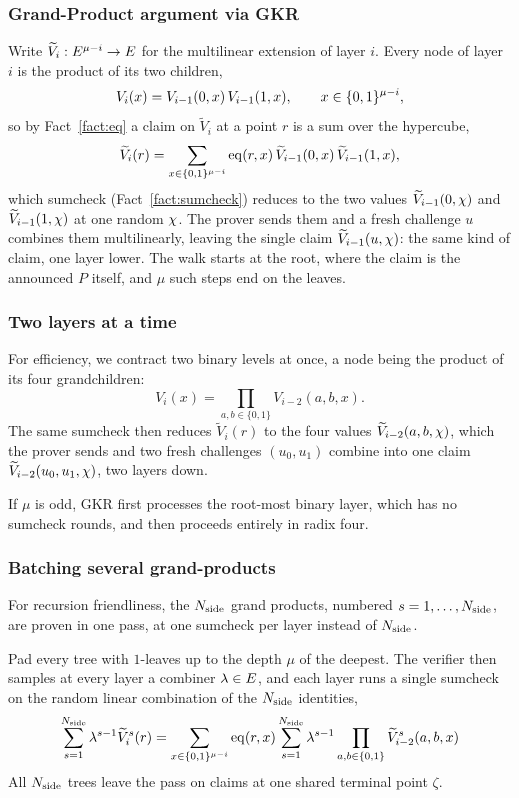 \subsubsection{Grand-Product argument via GKR}

Write $\widetilde V_i:E^{\mu-i}\to E$ for the multilinear extension of layer $i$. Every node of layer $i$ is the product of its two children,
\[
V_i(x)=V_{i-1}(0,x)\,V_{i-1}(1,x),\qquad x\in\{0,1\}^{\mu-i},
\]
so by Fact~\ref{fact:eq} a claim on $\widetilde V_i$ at a point $r$ is a sum over the hypercube,
\[
\widetilde V_i(r)=\sum_{x\in\{0,1\}^{\mu-i}}\operatorname{eq}(r,x)\,\widetilde V_{i-1}(0,x)\,\widetilde V_{i-1}(1,x),
\]
which sumcheck (Fact~\ref{fact:sumcheck}) reduces to the two values $\widetilde V_{i-1}(0,\chi)$ and $\widetilde V_{i-1}(1,\chi)$ at one random $\chi$. The prover sends them and a fresh challenge $u$ combines them multilinearly, leaving the single claim $\widetilde V_{i-1}(u,\chi)$: the same kind of claim, one layer lower. The walk starts at the root, where the claim is the announced $P$ itself, and $\mu$ such steps end on the leaves.

\subsubsection{Two layers at a time}

For efficiency, we contract two binary levels at once, a node being the product of its four grandchildren:
\[
V_i(x)=\prod_{a,b\in\{0,1\}}V_{i-2}(a,b,x).
\]
The same sumcheck then reduces $\widetilde V_i(r)$ to the four values $\widetilde V_{i-2}(a,b,\chi)$, which the prover sends and two fresh challenges $(u_0,u_1)$ combine into one claim $\widetilde V_{i-2}(u_0,u_1,\chi)$, two layers down.

If $\mu$ is odd, GKR first processes the root-most binary layer, which has no sumcheck rounds, and then proceeds entirely in radix four.

\subsubsection{Batching several grand-products}

For recursion friendliness, the $N_{\mathrm{side}}$ grand products, numbered $s=1,\dots,N_{\mathrm{side}}$, are proven in one pass, at one sumcheck per layer instead of $N_{\mathrm{side}}$.

Pad every tree with $1$-leaves up to the depth $\mu$ of the deepest. The verifier then samples at every layer a combiner $\lambda \in E$, and each layer runs a single sumcheck on the random linear combination of the $N_{\mathrm{side}}$ identities,
\[
\sum_{s=1}^{N_{\mathrm{side}}}\lambda^{s-1}\widetilde V_i^{s}(r)=\sum_{x\in\{0,1\}^{\mu-i}}\operatorname{eq}(r,x)\sum_{s=1}^{N_{\mathrm{side}}}\lambda^{s-1}\prod_{a,b\in\{0,1\}}\widetilde V_{i-2}^{s}(a,b,x)
\]
All $N_{\mathrm{side}}$ trees leave the pass on claims at one shared terminal point $\zeta$.

